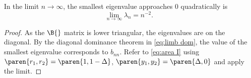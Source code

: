 \begin{theorem}
In the limit $n\to\infty$, the smallest eigenvalue approaches 0 quadratically is
  \begin{equation*}   %
      \lim_{n\to\infty} \lambda_{n} = n^{-2}.
  \end{equation*}
\label{thm:smallest eigenvalue}
\end{theorem}
\begin{proof}
As the $\B{}$ matrix is lower triangular, the eigenvalues are on the diagonal. By the diagonal dominance theorem in \ref{eq:limb dom}, the value of the smallest eigenvalue corresponds to $b_{nn}$. Refer to \eqref{eq:area I} using $\paren{r_{1}, r_{2}} = \paren{1, 1 - \Delta}$, $\paren{y_{1}, y_{2}} = \paren{\Delta,0}$ and apply the limit.
\end{proof}

\endinput %